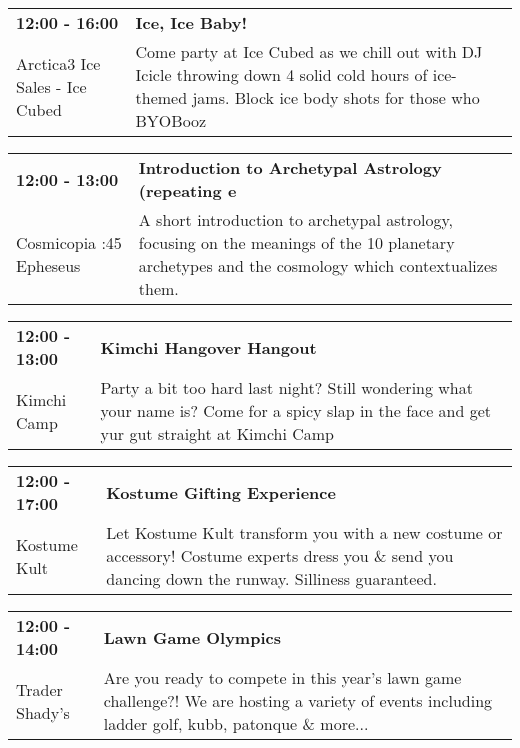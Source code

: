 \begin{tabular}{ p{1in} p{2.2in} }
    \textbf{12:00 - 16:00} & \textbf{Ice, Ice Baby!} \\
    Arctica3 Ice Sales - Ice Cubed \newline  & Come party at Ice Cubed as we chill out with DJ Icicle throwing down 4 solid cold hours of ice-themed jams. Block ice body shots for those who BYOBooz \\
    \hline 
\end{tabular}
    
\begin{tabular}{ p{1in} p{2.2in} }
    \textbf{12:00 - 13:00} & \textbf{Introduction to Archetypal Astrology (repeating e} \\
    Cosmicopia \newline 3:45 Epheseus & A short introduction to archetypal astrology, focusing on the meanings of the 10 planetary archetypes and the cosmology which contextualizes them. \\
    \hline 
\end{tabular}
    
\begin{tabular}{ p{1in} p{2.2in} }
    \textbf{12:00 - 13:00} & \textbf{Kimchi Hangover Hangout} \\
    Kimchi Camp \newline  & Party a bit too hard last night? Still wondering what your name is? Come for a spicy slap in the face and get yur gut straight at Kimchi Camp \\
    \hline 
\end{tabular}
    
\begin{tabular}{ p{1in} p{2.2in} }
    \textbf{12:00 - 17:00} & \textbf{Kostume Gifting Experience} \\
    Kostume Kult \newline  & Let Kostume Kult transform you with a new costume or accessory! Costume experts dress you \& send you dancing down the runway. Silliness guaranteed. \\
    \hline 
\end{tabular}
    
\begin{tabular}{ p{1in} p{2.2in} }
    \textbf{12:00 - 14:00} & \textbf{Lawn Game Olympics} \\
    Trader Shady's \newline  & Are you ready to compete in this year's lawn game challenge?!  We are hosting a variety of events including ladder golf, kubb, patonque \& more... \\
    \hline 
\end{tabular}
    

